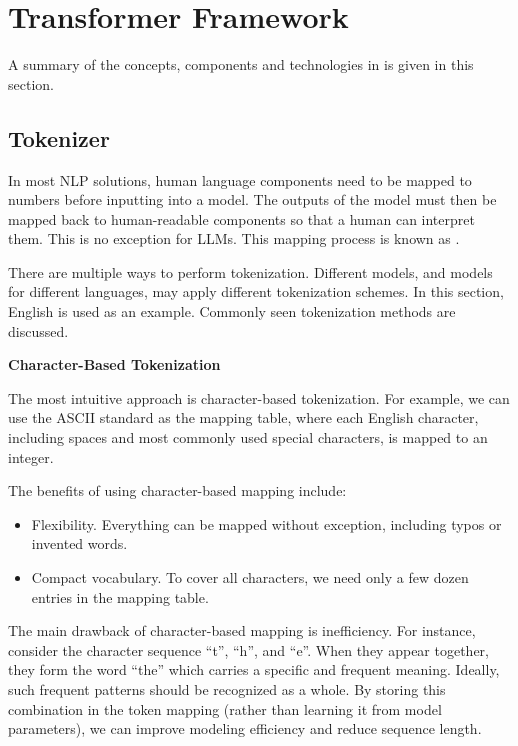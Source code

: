 \section{Transformer Framework}

A summary of the concepts, components and technologies in \cite{vaswani2017attention} is given in this section.

\subsection{Tokenizer}

In most NLP solutions, human language components need to be mapped to numbers before inputting into a model. The outputs of the model must then be mapped back to human-readable components so that a human can interpret them. This is no exception for LLMs. This mapping process is known as .

There are multiple ways to perform tokenization. Different models, and models for different languages, may apply different tokenization schemes. In this section, English is used as an example. Commonly seen tokenization methods are discussed.

\vspace{0.1in}
\noindent \textbf{Character-Based Tokenization}
\vspace{0.1in}

The most intuitive approach is character-based tokenization. For example, we can use the ASCII standard as the mapping table, where each English character, including spaces and most commonly used special characters, is mapped to an integer.

The benefits of using character-based mapping include:
\begin{itemize}
	\item Flexibility. Everything can be mapped without exception, including typos or invented words.
	\item Compact vocabulary. To cover all characters, we need only a few dozen entries in the mapping table.
\end{itemize}

The main drawback of character-based mapping is inefficiency. For instance, consider the character sequence ``t'', ``h'', and ``e''. When they appear together, they form the word ``the'' which carries a specific and frequent meaning. Ideally, such frequent patterns should be recognized as a whole. By storing this combination in the token mapping (rather than learning it from model parameters), we can improve modeling efficiency and reduce sequence length.

